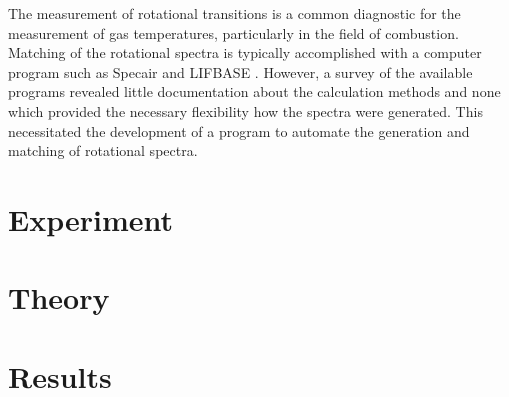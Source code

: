 The measurement of rotational transitions is a common diagnostic for the
measurement of gas temperatures, particularly in the field of combustion.
Matching of the rotational spectra is typically accomplished with a computer
program such as Specair \cite{Laux2002} and LIFBASE \cite{Luque1999}. However, a
survey of the available programs revealed little documentation about the
calculation methods and none which provided the necessary flexibility how the
spectra were generated. This necessitated the development of a program to
automate the generation and matching of rotational spectra.

\section{Experiment}


\section{Theory}


\section{Results}



